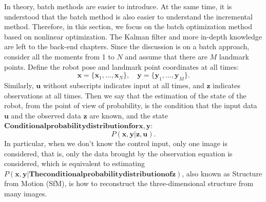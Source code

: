 In theory, batch methods are easier to introduce. At the same time, it is understood that the batch method is also easier to understand the incremental method. Therefore, in this section, we focus on the batch optimization method based on nonlinear optimization. The Kalman filter and more in-depth knowledge are left to the back-end chapters. Since the discussion is on a batch approach, consider all the moments from 1 to $N$ and assume that there are $M$ landmark points. Define the robot pose and landmark point coordinates at all times:
\[
\bm{x}=\{ \bm{x}_1, \ldots, \bm{x}_N \}, \quad \bm{y} = \{\bm{y}_1, \ldots, \bm{ y}_M \}.
\]
Similarly, $\bm{u}$ without subscripts indicates input at all times, and $\bm{z}$ indicates observations at all times. Then we say that the estimation of the state of the robot, from the point of view of probability, is the condition that the input data $\bm{u}$ and the observed data $\bm{z}$ are known, and the state $\bm{ Conditional probability distribution for x}, \bm{y}$:
\begin{equation}
P( \bm{x},\bm{y} | \bm{z}, \bm{u}).
\end{equation}
In particular, when we don't know the control input, only one image is considered, that is, only the data brought by the observation equation is considered, which is equivalent to estimating $P( \bm{x},\bm{y} | \bm{ The conditional probability distribution of z})$, also known as Structure from Motion (SfM), is how to reconstruct the three-dimensional structure \textsuperscript{\cite{Agarwal2009}} from many images.

